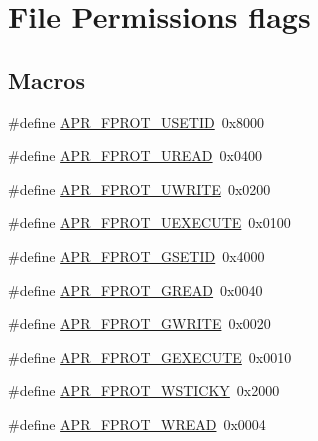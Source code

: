 \hypertarget{group__apr__file__permissions}{}\section{File Permissions flags}
\label{group__apr__file__permissions}
\subsection*{Macros}
\begin{DoxyCompactItemize}
\item 
\#define \mbox{\hyperlink{group__apr__file__permissions_ga67caebf5bbe4f3f4b6252a75e5ce066f}{A\+P\+R\+\_\+\+F\+P\+R\+O\+T\+\_\+\+U\+S\+E\+T\+ID}}~0x8000
\item 
\#define \mbox{\hyperlink{group__apr__file__permissions_gaab6c4c2e7b95f4345c248c27b3f1a655}{A\+P\+R\+\_\+\+F\+P\+R\+O\+T\+\_\+\+U\+R\+E\+AD}}~0x0400
\item 
\#define \mbox{\hyperlink{group__apr__file__permissions_ga50b985779b15fbfdae0758e98ffb92af}{A\+P\+R\+\_\+\+F\+P\+R\+O\+T\+\_\+\+U\+W\+R\+I\+TE}}~0x0200
\item 
\#define \mbox{\hyperlink{group__apr__file__permissions_ga156e1374a4ef30e745340d8c20b36d03}{A\+P\+R\+\_\+\+F\+P\+R\+O\+T\+\_\+\+U\+E\+X\+E\+C\+U\+TE}}~0x0100
\item 
\#define \mbox{\hyperlink{group__apr__file__permissions_ga5fcf6746afdd4e9b8be6ceab6892a3f5}{A\+P\+R\+\_\+\+F\+P\+R\+O\+T\+\_\+\+G\+S\+E\+T\+ID}}~0x4000
\item 
\#define \mbox{\hyperlink{group__apr__file__permissions_ga5ad9b67b8008db3ffc56c3c2a65aa192}{A\+P\+R\+\_\+\+F\+P\+R\+O\+T\+\_\+\+G\+R\+E\+AD}}~0x0040
\item 
\#define \mbox{\hyperlink{group__apr__file__permissions_gacecdc9f88b04c768150418688b786500}{A\+P\+R\+\_\+\+F\+P\+R\+O\+T\+\_\+\+G\+W\+R\+I\+TE}}~0x0020
\item 
\#define \mbox{\hyperlink{group__apr__file__permissions_gab627bef3f9ceb84bbf00906eaeb12184}{A\+P\+R\+\_\+\+F\+P\+R\+O\+T\+\_\+\+G\+E\+X\+E\+C\+U\+TE}}~0x0010
\item 
\#define \mbox{\hyperlink{group__apr__file__permissions_ga989dbea02f779a5f20a643d7e4ee9952}{A\+P\+R\+\_\+\+F\+P\+R\+O\+T\+\_\+\+W\+S\+T\+I\+C\+KY}}~0x2000
\item 
\#define \mbox{\hyperlink{group__apr__file__permissions_ga194718630250b0f0dd4be38c86dac717}{A\+P\+R\+\_\+\+F\+P\+R\+O\+T\+\_\+\+W\+R\+E\+AD}}~0x0004
\item 

\end{DoxyCompactItemize}

